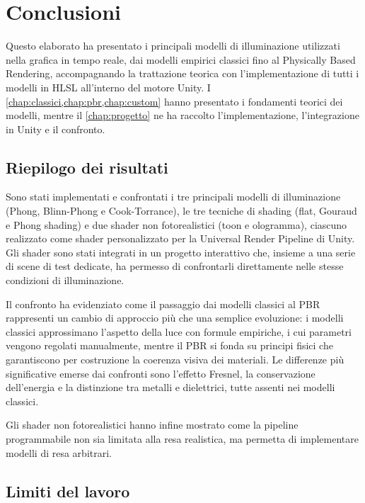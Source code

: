 \documentclass[12pt,a4paper,twoside]{book}
\begin{document}
\chapter{Conclusioni} \label{chap:conclusioni}

Questo elaborato ha presentato i principali modelli di illuminazione utilizzati nella grafica in tempo reale, dai modelli empirici classici fino al Physically Based Rendering, accompagnando la trattazione teorica con l'implementazione di tutti i modelli in HLSL all'interno del motore Unity. I \cref{chap:classici,chap:pbr,chap:custom} hanno presentato i fondamenti teorici dei modelli, mentre il \cref{chap:progetto} ne ha raccolto l'implementazione, l'integrazione in Unity e il confronto.

\section{Riepilogo dei risultati}

Sono stati implementati e confrontati i tre principali modelli di illuminazione (Phong, Blinn-Phong e Cook-Torrance), le tre tecniche di shading (flat, Gouraud e Phong shading) e due shader non fotorealistici (toon e ologramma), ciascuno realizzato come shader personalizzato per la Universal Render Pipeline di Unity. Gli shader sono stati integrati in un progetto interattivo che, insieme a una serie di scene di test dedicate, ha permesso di confrontarli direttamente nelle stesse condizioni di illuminazione.

Il confronto ha evidenziato come il passaggio dai modelli classici al PBR rappresenti un cambio di approccio più che una semplice evoluzione: i modelli classici approssimano l'aspetto della luce con formule empiriche, i cui parametri vengono regolati manualmente, mentre il PBR si fonda su principi fisici che garantiscono per costruzione la coerenza visiva dei materiali. Le differenze più significative emerse dai confronti sono l'effetto Fresnel, la conservazione dell'energia e la distinzione tra metalli e dielettrici, tutte assenti nei modelli classici.

Gli shader non fotorealistici hanno infine mostrato come la pipeline programmabile non sia limitata alla resa realistica, ma permetta di implementare modelli di resa arbitrari.

\section{Limiti del lavoro}
\end{document}
